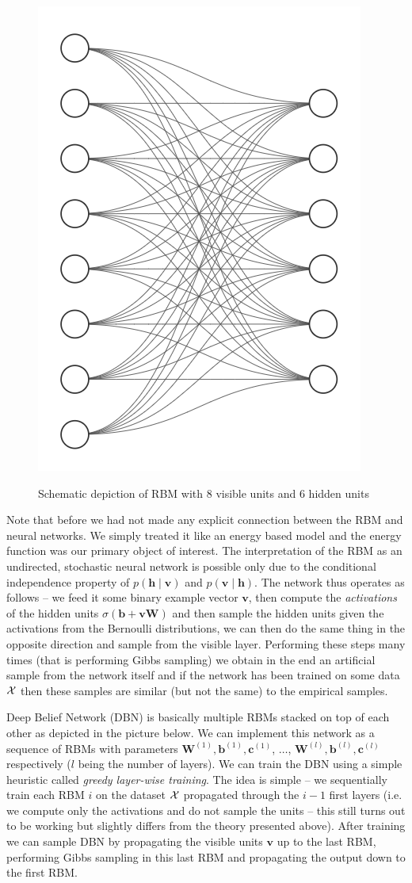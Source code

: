\documentclass{myclass}
\begin{document}
\begin{figure}[ht]
   \centering
   \includegraphics[width=0.45\columnwidth]{figs/rbm.png}
   \label{fig:rbm}
   \caption{Schematic depiction of RBM with 8 visible units and 6 hidden units}
\end{figure}

Note that before we had not made any explicit connection between the RBM and neural networks. We
simply treated it like an energy based model and the energy function was our primary object of
interest. The interpretation of the RBM as an undirected, stochastic neural network is possible only
due to the conditional independence property of $p(\bm{h} \mid \bm{v})$ and $p(\bm{v} \mid \bm{h})$.
The network thus operates as follows -- we feed it some binary example vector $\bm{v}$, then compute
the \emph{activations} of the hidden units $\sigma(\bm{b} + \bm{v}\bm{W})$ and then sample the
hidden units given the activations from the Bernoulli distributions, we can then do the same thing
in the opposite direction and sample from the visible layer. Performing these steps many times (that
is performing Gibbs sampling) we obtain in the end an artificial sample from the network itself and
if the network has been trained on some data $\mathcal{X}$ then these samples are similar (but not the
same) to the empirical samples.

Deep Belief Network (DBN) is basically multiple RBMs stacked on top of each other as depicted in the
picture below. We can implement this network as a sequence of RBMs with parameters $\bm{W}^{(1)},
\bm{b}^{(1)}, \bm{c}^{(1)}$, $\ldots$, $\bm{W}^{(l)}, \bm{b}^{(l)}, \bm{c}^{(l)}$ respectively ($l$
being the number of layers). We can train the DBN using a simple heuristic called \emph{greedy
layer-wise training}. The idea is simple -- we sequentially train each RBM $i$ on the dataset
$\mathcal{X}$ propagated through the $i-1$ first layers (i.e. we compute only the activations and do not
sample the units -- this still turns out to be working but slightly differs from the theory
presented above). After training we can sample DBN by propagating the visible units $\bm{v}$ up to
the last RBM, performing Gibbs sampling in this last RBM and propagating the output down to the
first RBM.
\end{document}
